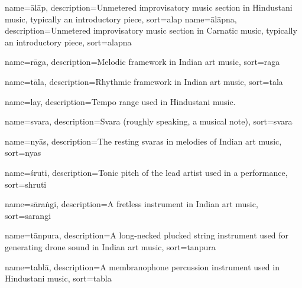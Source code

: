 
{
	name={\={a}l\={a}p},
	description={Unmetered improvisatory music section in Hindustani music, typically an introductory piece},
	sort=alap
}
{
	name={\={a}l\={a}pna},
	description={Unmetered improvisatory music section in Carnatic music, typically an introductory piece},
	sort=alapna
}

{
  name={r\={a}ga},
  description={Melodic framework in Indian art music},
  sort=raga
}


{
	name={t\={a}la},
	description={Rhythmic framework in Indian art music},
	sort=tala
}

{
	name={lay},
	description={Tempo range used in Hindustani music.}
}

{
	name={svara},
	description={Svara (roughly speaking, a musical note)},
	sort=svara
}


{
	name={ny\={a}s},
	description={The resting svaras in melodies of Indian art music},
	sort=nyas
}

{
	name={\'sruti},
	description={Tonic pitch of the lead artist used in a performance},
	sort=shruti
}

{
	name={s\={a}ra\.{n}gi},
	description={A fretless instrument in Indian art music},
	sort=sarangi
}

{
	name={t\={a}npura},
	description={A long-necked plucked string instrument used for generating drone sound in Indian art music},
	sort=tanpura
}

{
	name={tabl\={a}},
	description={A membranophone percussion instrument used in Hindustani music},
	sort=tabla
}

	
	
	
